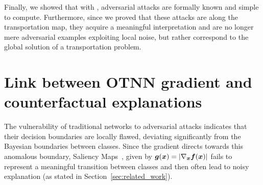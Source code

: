 Finally, we showed that with \otnn, adversarial attacks are formally known and simple to compute.
Furthermore, since we proved that these attacks are along the transportation map, they acquire a meaningful interpretation and are no longer mere adversarial examples exploiting local noise, but rather correspond to the global solution of a transportation problem.
\section{Link between OTNN gradient and counterfactual explanations}

The vulnerability of traditional networks to adversarial attacks indicates that their decision boundaries are locally flawed, deviating significantly from the Bayesian boundaries between classes. Since the gradient directs towards this anomalous boundary, Saliency Maps~\cite{SimonyanVZ13}, given by $ \bm{g}(\bm{x}) = | \nabla_{\bm{x}} \bm{f}(\bm{x}) | $ fails to represent a meaningful transition between classes and then often lead to noisy explanation (as stated in Section~\ref{sec:related_work}).

